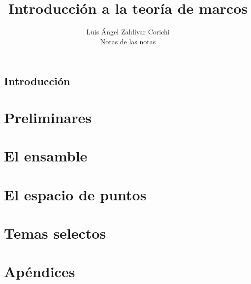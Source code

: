 \documentclass[12pt,letterpaper,titlepage,draft]{book}
\title{Introducción a la teoría de marcos}
\author{Luis Ángel Zaldívar Corichi \\
\small{Notas de las notas}}
\theoremstyle{definition}
\newcommand\<{\langle}
\renewcommand\>{\rangle}
\begin{document}
\maketitle

\chapter*{Introducción}


\tableofcontents

\part{Preliminares}






\part{El ensamble} \label{part:ensamble}





\part{El espacio de puntos} \label{part:espacio-de-puntos}






\part{Temas selectos}








\part{Apéndices}



\printbibliography
\end{document}
